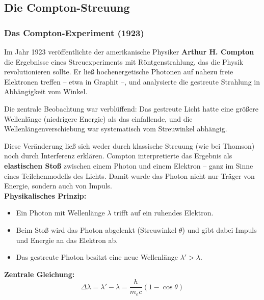 \subsection{Die Compton-Streuung}

\subsubsection{Das Compton-Experiment (1923)}

Im Jahr 1923 veröffentlichte der amerikanische Physiker \textbf{Arthur H. Compton} die Ergebnisse eines Streuexperiments mit Röntgenstrahlung, das die Physik revolutionieren sollte. Er ließ hochenergetische Photonen auf nahezu freie Elektronen treffen – etwa in Graphit –, und analysierte die gestreute Strahlung in Abhängigkeit vom Winkel.

Die zentrale Beobachtung war verblüffend: Das gestreute Licht hatte eine größere Wellenlänge (niedrigere Energie) als das einfallende, und die Wellenlängenverschiebung war systematisch vom Streuwinkel abhängig.

Diese Veränderung ließ sich weder durch klassische Streuung (wie bei Thomson) noch durch Interferenz erklären. Compton interpretierte das Ergebnis als \textbf{elastischen Stoß} zwischen einem Photon und einem Elektron – ganz im Sinne eines Teilchenmodells des Lichts. Damit wurde das Photon nicht nur Träger von Energie, sondern auch von Impuls.\\

\textbf{Physikalisches Prinzip:}
\begin{itemize}
	\item Ein Photon mit Wellenlänge \( \lambda \) trifft auf ein ruhendes Elektron.
	\item Beim Stoß wird das Photon abgelenkt (Streuwinkel \( \theta \)) und gibt dabei Impuls und Energie an das Elektron ab.
	\item Das gestreute Photon besitzt eine neue Wellenlänge \( \lambda' > \lambda \).
\end{itemize}

\textbf{Zentrale Gleichung:}
\[
\Delta \lambda = \lambda' - \lambda = \frac{h}{m_e c}(1 - \cos \theta)
\]

